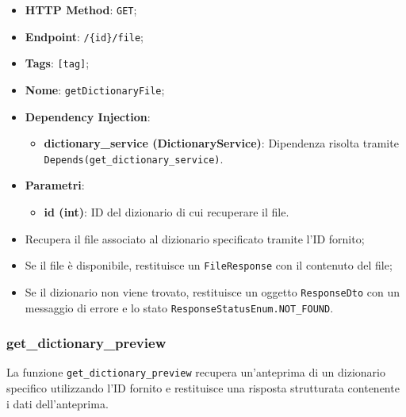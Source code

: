\begin{itemize}
\item \textbf{HTTP Method}: \texttt{GET};
\item \textbf{Endpoint}: \texttt{/\{id\}/file};
\item \textbf{Tags}: \texttt{[tag]};
\item \textbf{Nome}: \texttt{getDictionaryFile};
\item \textbf{Dependency Injection}:
\begin{itemize}
\item \textbf{dictionary\_service (DictionaryService)}: Dipendenza risolta tramite \texttt{Depends(get\_dictionary\_service)}.
\end{itemize}
\item \textbf{Parametri}:
\begin{itemize}
\item \textbf{id (int)}: ID del dizionario di cui recuperare il file.
\end{itemize}
\end{itemize}

\begin{itemize}
\item Recupera il file associato al dizionario specificato tramite l'ID fornito;
\item Se il file è disponibile, restituisce un \texttt{FileResponse} con il contenuto del file;
\item Se il dizionario non viene trovato, restituisce un oggetto \texttt{ResponseDto} con un messaggio di errore e lo stato \texttt{ResponseStatusEnum.NOT\_FOUND}.
\end{itemize}


\subsubsection{get\_dictionary\_preview}

\par La funzione \texttt{get\_dictionary\_preview} recupera un'anteprima di un dizionario specifico utilizzando l'ID fornito e restituisce una risposta strutturata contenente i dati dell'anteprima.

